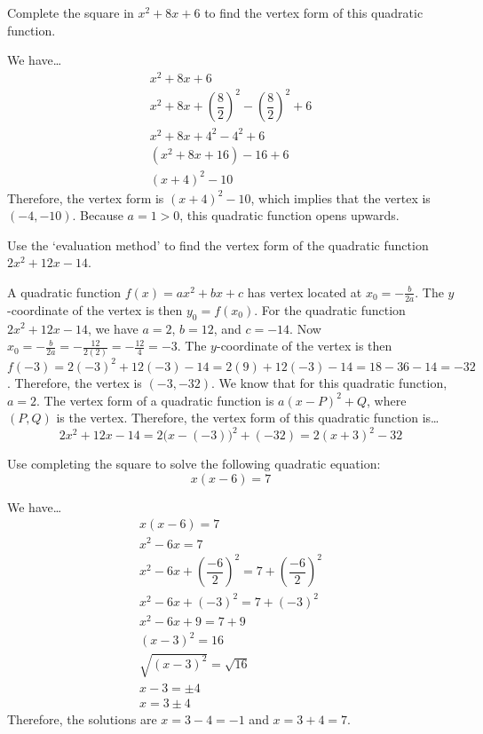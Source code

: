 \documentclass[11pt,letterpaper]{article}
\begin{document}

 Complete the square in $x^2 + 8x + 6$ to find the vertex form of this quadratic function. \pspace

\sol We have\dots
	\[
	\begin{gathered}
	x^2 + 8x + 6 \\[0.3cm]
	x^2 + 8x + \left( \dfrac{8}{2} \right)^2 - \left( \dfrac{8}{2} \right)^2 + 6 \\[0.3cm]
	x^2 + 8x + 4^2 - 4^2 + 6 \\[0.3cm]
	(x^2 + 8x + 16) - 16 + 6 \\[0.3cm]
	(x + 4)^2 - 10 
	\end{gathered}
	\] \pspace
Therefore, the vertex form is $(x + 4)^2 - 10$, which implies that the vertex is $(-4, -10)$. Because $a= 1 > 0$, this quadratic function opens upwards. 



\newpage



 Use the `evaluation method' to find the vertex form of the quadratic function $2x^2 + 12x - 14$. \pspace

\sol A quadratic function $f(x)= ax^2 + bx + c$ has vertex located at $x_0= -\frac{b}{2a}$. The $y$-coordinate of the vertex is then $y_0= f(x_0)$. For the quadratic function $2x^2 + 12x - 14$, we have $a= 2$, $b= 12$, and $c= -14$. Now $x_0= -\frac{b}{2a}= -\frac{12}{2(2)}= -\frac{12}{4}= -3$. The $y$-coordinate of the vertex is then $f(-3)= 2(-3)^2 + 12(-3) - 14= 2(9) + 12(-3) - 14= 18 - 36 - 14= -32$. Therefore, the vertex is $(-3, -32)$. We know that for this quadratic function, $a= 2$. The vertex form of a quadratic function is $a(x - P)^2 + Q$, where $(P, Q)$ is the vertex. Therefore, the vertex form of this quadratic function is\dots
	\[
	2x^2 + 12x - 14= 2 \big(x - (-3) \big)^2 + (-32)= 2(x + 3)^2 - 32
	\] 



\newpage



 Use completing the square to solve the following quadratic equation: 
	\[
	x(x - 6)= 7
	\] \pspace

\sol We have\dots
	\[
	\begin{gathered}
	x(x - 6)= 7 \\[0.3cm]
	x^2 - 6x= 7 \\[0.3cm]
	x^2 - 6x + \left( \dfrac{-6}{2} \right)^2= 7 + \left( \dfrac{-6}{2} \right)^2 \\[0.3cm]
	x^2 - 6x + (-3)^2= 7 + (-3)^2 \\[0.3cm]
	x^2 - 6x + 9= 7 + 9 \\[0.3cm]
	(x - 3)^2= 16 \\[0.3cm]
	\sqrt{(x - 3)^2}= \sqrt{16} \\[0.3cm]
	x - 3= \pm 4 \\[0.3cm]
	x= 3 \pm 4
	\end{gathered}
	\] \pspace
Therefore, the solutions are $x= 3 - 4= -1$ and $x= 3 + 4= 7$. 
\end{document}
